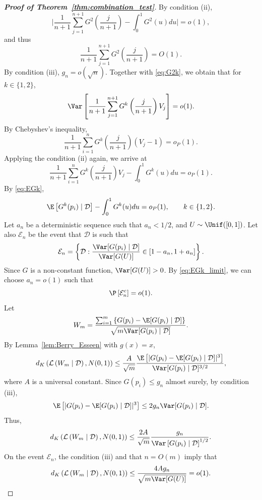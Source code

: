 \begin{proof}[\textbf{Proof of Theorem~\ref{thm:combination_test}}]
By condition (ii),
\[\bigg|\frac{1}{n+1}\sum_{j=1}^{n + 1}G^{2}\left(\frac{j}{n+1}\right) - \int_0^1 G^2(u)du\bigg| = o(1),\]
and thus
\[\frac{1}{n+1}\sum_{j=1}^{n + 1}G^{2}\left(\frac{j}{n+1}\right) = O(1).\]
By condition (iii), $g_{n} = o(\sqrt{n})$. Together with \eqref{eq:G2k}, we obtain that for $k\in \{1, 2\}$,
\[\Var\left[\frac{1}{n+1}\sum_{j=1}^{n+1}G^k\left(\frac{j}{n+1}\right)V_{j}\right] = o(1).\]
By Chebyshev's inequality,
\[\frac{1}{n+1}\sum_{i=1}^{n}G^{k}\left(\frac{j}{n+1}\right)(V_{j} - 1) = o_{P}(1).\]
Applying the condition (ii) again, we arrive at
\begin{equation*}
\frac{1}{n+1}\sum_{i=1}^{n}G^{k}\left(\frac{j}{n+1}\right)V_{j} - \int_{0}^{1}G^k(u)du = o_{P}(1).
\end{equation*}
By \eqref{eq:EGk},
\begin{equation}\label{eq:EGk_limit}
\E\left[G^k(p_i)\mid \mathcal{D}\right] - \int_{0}^{1}G^k(u)du = o_{P}(1), \qquad k\in \{1, 2\}.
\end{equation}
Let $a_{n}$ be a deterministic sequence such that $a_{n} < 1 / 2$, and $U\sim \Unif([0, 1])$. Let also $\mathcal{E}_{n}$ be the event that $\mathcal{D}$ is such that
\begin{equation}\label{eq:event_Var}
    \mathcal{E}_{n} = \left\{\mathcal{D}: \frac{\Var[G(p_i)\mid \mathcal{D}]}{\Var[G(U)]}\in [1 - a_{n}, 1 + a_{n}]\right\}.
\end{equation}
Since $G$ is a non-constant function, $\Var[G(U)] > 0$. By \eqref{eq:EGk_limit}, we can choose $a_n = o(1)$ such that
\[\P\left[\mathcal{E}_{n}^c\right] = o(1).\]
Let
\[W_{m} = \frac{\sum_{i=1}^{m}\left\{G(p_i) - \E[G(p_i)\mid \mathcal{D}]\right\}}{\sqrt{m\Var[G(p_i)\mid \mathcal{D}]}}.\]
By Lemma~\ref{lem:Berry_Esseen} with $g(x) = x$,
\[d_{K}\left(\mathcal{L}\left(W_{m}\mid \mathcal{D}\right), N(0, 1)\right)\le \frac{A}{\sqrt{m}}\frac{\E\left[|G(p_i) - \E[G(p_i)\mid \mathcal{D}]|^3\right]}{\Var[G(p_i)\mid \mathcal{D}]^{3/2}},\]
where $A$ is a universal constant. Since $G(p_i)\le g_{n}$ almost surely, by condition (iii),
\[\E\left[|G(p_i) - \E[G(p_i)\mid \mathcal{D}]|^3\right]\le 2g_{n}\Var[G(p_i)\mid \mathcal{D}].\]
Thus,
\[d_{K}\left(\mathcal{L}\left(W_{m}\mid \mathcal{D}\right), N(0, 1)\right)\le \frac{2A}{\sqrt{m}}\frac{g_{n}}{\Var\left[G(p_i)\mid \mathcal{D}\right]^{1/2}}.\]
On the event $\mathcal{E}_{n}$, the condition (iii) and that $n = O(m)$ imply that
\begin{equation*}
  d_{K}\left(\mathcal{L}\left(W_{m}\mid \mathcal{D}\right), N(0, 1)\right)\le \frac{4Ag_{n}}{\sqrt{m\Var[G(U)]}} = o(1).

\end{equation*}
\end{proof}
